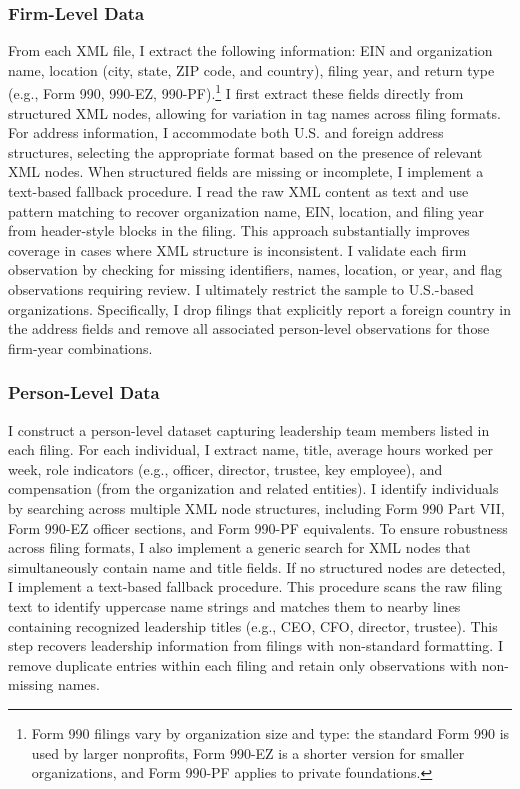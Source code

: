 \documentclass[12pt]{article}
\begin{document}
    \subsubsection{Firm-Level Data}

    From each XML file, I extract the following information: EIN and organization name, location (city, state, ZIP code, and country), filing year, and return type (e.g., Form 990, 990-EZ, 990-PF).\footnote{Form 990 filings vary by organization size and type: the standard Form 990 is used by larger nonprofits, Form 990-EZ is a shorter version for smaller organizations, and Form 990-PF applies to private foundations.} I first extract these fields directly from structured XML nodes, allowing for variation in tag names across filing formats. For address information, I accommodate both U.S. and foreign address structures, selecting the appropriate format based on the presence of relevant XML nodes. When structured fields are missing or incomplete, I implement a text-based fallback procedure. I read the raw XML content as text and use pattern matching to recover organization name, EIN, location, and filing year from header-style blocks in the filing. This approach substantially improves coverage in cases where XML structure is inconsistent. I validate each firm observation by checking for missing identifiers, names, location, or year, and flag observations requiring review. I ultimately restrict the sample to U.S.-based organizations. Specifically, I drop filings that explicitly report a foreign country in the address fields and remove all associated person-level observations for those firm-year combinations.

    \subsubsection{Person-Level Data}

    I construct a person-level dataset capturing leadership team members listed in each filing. For each individual, I extract name, title, average hours worked per week, role indicators (e.g., officer, director, trustee, key employee), and compensation (from the organization and related entities). I identify individuals by searching across multiple XML node structures, including Form 990 Part VII, Form 990-EZ officer sections, and Form 990-PF equivalents. To ensure robustness across filing formats, I also implement a generic search for XML nodes that simultaneously contain name and title fields. If no structured nodes are detected, I implement a text-based fallback procedure. This procedure scans the raw filing text to identify uppercase name strings and matches them to nearby lines containing recognized leadership titles (e.g., CEO, CFO, director, trustee). This step recovers leadership information from filings with non-standard formatting. I remove duplicate entries within each filing and retain only observations with non-missing names.
\end{document}
